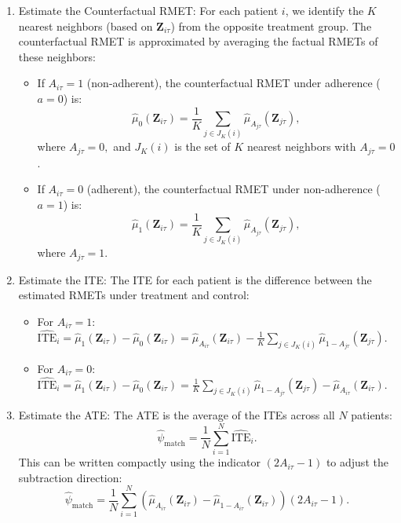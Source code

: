 \begin{enumerate}
\item Estimate the Counterfactual RMET:
   For each patient $ i $, we identify the $ K $ nearest neighbors (based on $ \mathbf{Z}_{i\tau} $) from the opposite treatment group. The counterfactual RMET is approximated by averaging the factual RMETs of these neighbors:
   \begin{itemize}
   \item If $ A_{i\tau} = 1 $ (non-adherent), the counterfactual RMET under adherence ($ a = 0 $) is:
     $$ \widehat{\mu}_{0}(\mathbf{Z}_{i\tau}) = \frac{1}{K} \sum_{j \in J_K(i)} \widehat{\mu}_{A_{j\tau}}(\mathbf{Z}_{j\tau}),$$
     where $ A_{j\tau} = 0, $
     and $ J_K(i) $ is the set of $ K $ nearest neighbors with $ A_{j\tau} = 0 $.
   \item If $ A_{i\tau} = 0 $ (adherent), the counterfactual RMET under non-adherence ($ a = 1 $) is:
     $$ \widehat{\mu}_{1}(\mathbf{Z}_{i\tau}) = \frac{1}{K} \sum_{j \in J_K(i)} \widehat{\mu}_{A_{j\tau}}(\mathbf{Z}_{j\tau}),$$ where $A_{j\tau} = 1. $
    \end{itemize}
\item Estimate the ITE:
   The ITE for each patient is the difference between the estimated RMETs under treatment and control:
   \begin{itemize}
   \item For $ A_{i\tau} = 1 $:
     $ \widehat{\text{ITE}}_i = \widehat{\mu}_{1}(\mathbf{Z}_{i\tau}) - \widehat{\mu}_{0}(\mathbf{Z}_{i\tau}) = \widehat{\mu}_{A_{i\tau}}(\mathbf{Z}_{i\tau}) - \frac{1}{K} \sum_{j \in J_K(i)} \widehat{\mu}_{1-A_{j\tau}}(\mathbf{Z}_{j\tau}). $
   \item For $ A_{i\tau} = 0 $:
     $ \widehat{\text{ITE}}_i = \widehat{\mu}_{1}(\mathbf{Z}_{i\tau}) - \widehat{\mu}_{0}(\mathbf{Z}_{i\tau}) = \frac{1}{K} \sum_{j \in J_K(i)} \widehat{\mu}_{1-A_{j\tau}}(\mathbf{Z}_{j\tau}) - \widehat{\mu}_{A_{i\tau}}(\mathbf{Z}_{i\tau}). $
    \end{itemize}
\item Estimate the ATE:
   The ATE is the average of the ITEs across all $ N $ patients:
   $$ \widehat{\psi}_{\text{match}} = \frac{1}{N} \sum_{i=1}^{N} \widehat{\text{ITE}}_i. $$
   This can be written compactly using the indicator $ (2 A_{i\tau} - 1) $ to adjust the subtraction direction:
   {\footnotesize
   $$ \widehat{\psi}_{\text{match}} = \frac{1}{N} \sum_{i=1}^{N} \left( \widehat{\mu}_{A_{i\tau}}(\mathbf{Z}_{i\tau}) - \widehat{\mu}_{1 - A_{i\tau}}(\mathbf{Z}_{i\tau}) \right) (2 A_{i\tau} - 1). $$}
   \begin{itemize}

\end{itemize}
\end{enumerate}
